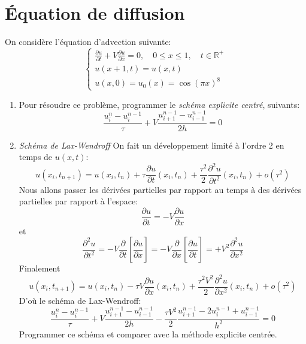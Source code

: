 \documentclass{article}
\begin{document}
\section{Équation de diffusion}
On considère l'équation d'advection suivante:
$$ \left\{ 
    \begin{array}{l}
\displaystyle \frac{\partial u}{\partial t}+ V\frac{\partial u}{\partial x}=0, \quad 0 \leq x \leq 1,\quad t \in \mathbb{R}^+\\
u(x+1,t)=u(x,t)\\
u(x,0)=u_0(x)= \cos(\pi x)^8
    \end{array}  
    \right. 
  $$
\begin{enumerate}
\item   Pour résoudre ce problème, programmer le {\em schéma explicite centré}, suivants:
  \[\frac{u^n_i-u^{n-1}_i}{\tau}+V \frac{u^{n-1}_{i+1}-u^{n-1}_{i-1}}{2h}=0\]
\item {\em Schéma de Lax-Wendroff}
On fait un développement limité à l'ordre 2 en temps de $u(x,t)$:
\[u(x_i,t_{n+1}) = u(x_i,t_{n})+\tau \frac{\partial u}{\partial t}(x_i,t_n)+\frac{\tau^2}{2}\frac{\partial^2 u}{\partial t^2}(x_i,t_n)+o(\tau^2)\]
Nous allons passer les dérivées partielles par rapport au temps à des dérivées partielles par rapport à l'espace:
\[\frac{\partial u}{\partial t}=- V\frac{\partial u}{\partial x}\]
et 
\[\frac{\partial^2 u}{\partial t^2}=- V\frac{\partial}{\partial t}\left[\frac{\partial u}{\partial x}\right]=- V\frac{\partial}{\partial x}\left[\frac{\partial u}{\partial t}\right]=+ V^2\frac{\partial^2 u}{\partial x^2}\]
Finalement
\[u(x_i,t_{n+1})= u(x_i,t_{n})-\tau V\frac{\partial u}{\partial x}(x_i,t_n)+\frac{\tau^2 V^2}{2}\frac{\partial^2 u}{\partial x^2}(x_i,t_n)+o(\tau^2)\]
D'où le schéma de Lax-Wendroff:
\[\frac{u^n_i-u^{n-1}_i}{\tau}+V \frac{u^{n-1}_{i+1}-u^{n-1}_{i-1}}{2h}-\frac{\tau V^2}{2}\frac{u^{n-1}_{i+1}-2u^{n-1}_{i}+u^{n-1}_{i-1}}{h^2}=0\]
Programmer ce schéma et comparer avec la méthode explicite centrée.
\end{enumerate}


  
\end{document}
